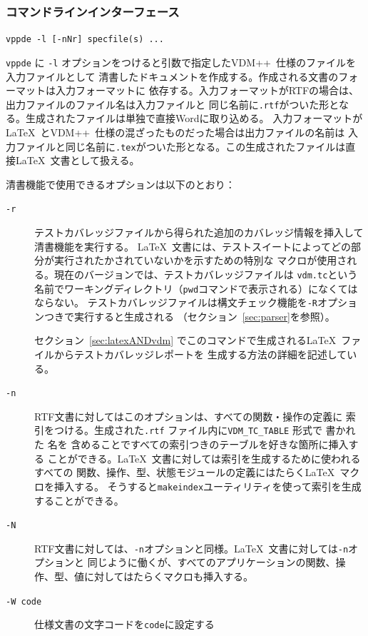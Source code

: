 \documentclass[\pformat,12pt]{jarticle}
\newcommand{\vdmslpp}{VDM++}
\newcommand{\vdmde}{vppde}
\begin{document}
\subsubsection{コマンドラインインターフェース} \label{vdm2tex}

{\tt \vdmde\ -l [-nNr] specfile(s) ...}

\vspace{0.5cm}

\noindent

{\tt \vdmde} に {\tt -l} オプションをつけると引数で指定した\vdmslpp\ 仕様のファイルを入力ファイルとして
清書したドキュメントを作成する。作成される文書のフォーマットは入力フォーマットに
依存する。入力フォーマットがRTFの場合は、出力ファイルのファイル名は入力ファイルと
同じ名前に{\tt .rtf}がついた形となる。生成されたファイルは単独で直接Wordに取り込める。
入力フォーマットが\LaTeX\ と\vdmslpp\ 仕様の混ざったものだった場合は出力ファイルの名前は
入力ファイルと同じ名前に{\tt .tex}がついた形となる。この生成されたファイルは直接\LaTeX\ 
文書として扱える。

清書機能で使用できるオプションは以下のとおり：

\begin{description}


\item[{\tt -r}]
  テストカバレッジファイルから得られた追加のカバレッジ情報を挿入して清書機能を実行する。
  \LaTeX\ 文書には、テストスイートによってどの部分が実行されたかされていないかを示すための特別な
  マクロが使用される。現在のバージョンでは、テストカバレッジファイルは
  {\tt vdm.tc}という名前でワーキングディレクトリ（\texttt{pwd}コマンドで表示される）になくてはならない。
  テストカバレッジファイルは構文チェック機能を{\tt -R}オプションつきで実行すると生成される
  （セクション~\ref{sec:parser}を参照）。
  
  セクション~\ref{sec:latexANDvdm} でこのコマンドで生成される\LaTeX\ ファイルからテストカバレッジレポートを
  生成する方法の詳細を記述している。

\item[{\tt -n}]
  RTF文書に対してはこのオプションは、すべての関数・操作の定義に
  索引をつける。生成された{\tt .rtf} ファイル内に\texttt{VDM\_TC\_TABLE} 形式で
  書かれた
   名を
  含めることですべての索引つきのテーブルを好きな箇所に挿入する
  ことができる。\LaTeX\ 文書に対しては索引を生成するために使われるすべての
  関数、操作、型、状態モジュールの定義にはたらく\LaTeX\ マクロを挿入する。
  そうすると{\tt makeindex}ユーティリティを使って索引を生成することができる。

\item[{\tt -N}]
  RTF文書に対しては、{\tt -n}オプションと同様。\LaTeX\ 文書に対しては{\tt -n}オプションと
  同じように働くが、すべてのアプリケーションの関数、操作、型、値に対してはたらくマクロも挿入する。

\item[{\tt -W code}] 仕様文書の文字コードを{\tt code}に設定する

\end{description}
\end{document}
